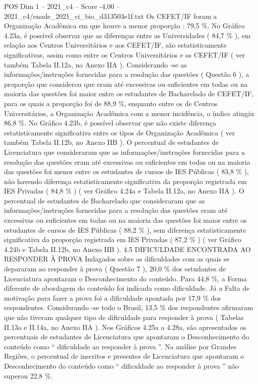 \begin{textsample}{POS Dim 1 – 2021\_c4 – Score -4.00 – 2021\_c4/enade\_2021\_ci\_bio\_d313503e1f.txt}
Os CEFET/IF foram a Organização Acadêmica em que houve a menor proporção : 79,5 \%.
No Gráfico 4.23a, é possível observar que as diferenças entre as Universidades ( 84,7 \% ), em relação aos Centros Universitários e aos CEFET/IF, são estatisticamente significativas, assim como entre os Centros Universitários e os CEFET/IF ( ver também Tabela II.12a, no Anexo IIA ).
Considerando -se as informações/instruções fornecidas para a resolução das questões ( Questão 6 ), a proporção que considerou que eram até excessivas ou suficientes em todas ou na maioria das questões foi maior entre os estudantes de Bacharelado de CEFET/IF, para os quais a proporção foi de 88,9 \%, enquanto entre os de Centros Universitários, a Organização Acadêmica com a menor incidência, o índice atingiu 86,8 \%.
No Gráfico 4.23b, é possível observar que não existe diferença estatisticamente significativa entre os tipos de Organização Acadêmica ( ver também Tabela II.12b, no Anexo IIB ).
O percentual de estudantes de Licenciatura que consideraram que as informações/instruções fornecidas para a resolução das questões eram até excessivas ou suficientes em todas ou na maioria das questões foi menor entre os estudantes de cursos de IES Públicas ( 83,8 \% ), não havendo diferença estatisticamente significativa da proporção registrada em IES Privadas ( 84,8 \% ) ( ver Gráfico 4.24a e Tabela II.12a, no Anexo IIA ).
O percentual de estudantes de Bacharelado que consideraram que as informações/instruções fornecidas para a resolução das questões eram até excessivas ou suficientes em todas ou na maioria das questões foi maior entre os estudantes de cursos de IES Públicas ( 88,2 \% ), sem diferença estatisticamente significativa da proporção registrada em IES Privadas ( 87,2 \% ) ( ver Gráfico 4.24b e Tabela II.12b, no Anexo IIB ). 4.5 DIFICULDADE ENCONTRADA AO RESPONDER À PROVA Indagados sobre as dificuldades com as quais se depararam ao responder à prova ( Questão 7 ), 20,0 \% dos estudantes de Licenciatura apontaram o Desconhecimento do conteúdo.
Para 44,8 \%, a Forma diferente de abordagem do conteúdo foi indicada como dificuldade.
Já a Falta de motivação para fazer a prova foi a dificuldade apontada por 17,9 \% dos respondentes.
Considerando -se todo o Brasil, 13,5 \% dos respondentes afirmaram que não tiveram qualquer tipo de dificuldade para responder à prova ( Tabelas II.13a e II.14a, no Anexo IIA ).
Nos Gráficos 4.25a a 4.28a, são apresentados os percentuais de estudantes de Licenciatura que apontaram o Desconhecimento do conteúdo como “ dificuldade ao responder à prova ”.
Na análise por Grandes Regiões, o percentual de inscritos e presentes de Licenciatura que apontaram o Desconhecimento do conteúdo como “ dificuldade ao responder à prova ” não superou 22,8 \%.

\end{textsample}
